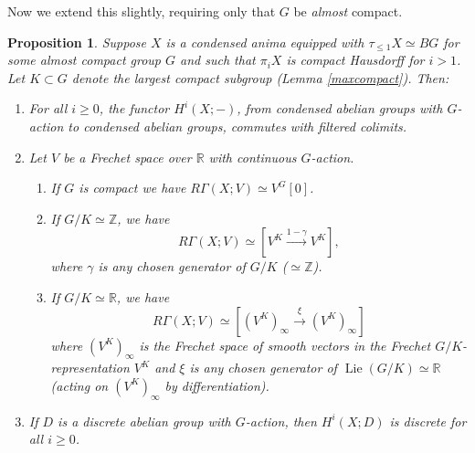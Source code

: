 \documentclass[12pt]{article}
\newtheorem{proposition}[theorem]{Proposition}
\theoremstyle{definition}
\newcommand{\on}{\operatorname}
\newcommand{\mbb}{\mathbb}
\begin{document}
Now we extend this slightly, requiring only that $G$ be \emph{almost} compact.

\begin{proposition}\label{cohachaus}
Suppose $X$ is a condensed anima equipped with $\tau_{\leq 1}X\simeq BG$ for some almost compact group $G$ and such that $\pi_iX$ is compact Hausdorff for $i>1$.  Let $K\subset G$ denote the largest compact subgroup (Lemma \ref{maxcompact}).  Then:
\begin{enumerate}
\item For all $i\geq 0$, the functor $H^i(X;-)$, from condensed abelian groups with $G$-action to condensed abelian groups, commutes with filtered colimits.
\item Let $V$ be a Frechet space over $\mbb{R}$ with continuous $G$-action.
\begin{enumerate}
\item If $G$ is compact we have $R\Gamma(X;V) \simeq V^G[0]$.
\item If $G/K\simeq \mbb{Z}$, we have
$$R\Gamma(X;V) \simeq [V^K \overset{1-\gamma}{\longrightarrow} V^K],$$
where $\gamma$ is any chosen generator of $G/K$ ($\simeq \mbb{Z}$).
\item If $G/K\simeq \mbb{R}$, we have
$$R\Gamma(X;V) \simeq [(V^K)_\infty \overset{\xi}{\longrightarrow}(V^K)_\infty]$$
where $(V^K)_\infty$ is the Frechet space of smooth vectors in the Frechet $G/K$-representation $V^K$ and $\xi$ is any chosen generator of $\on{Lie}(G/K)\simeq \mbb{R}$ (acting on $(V^K)_\infty$ by differentiation).
\end{enumerate}

\item If $D$ is a discrete abelian group with $G$-action, then $H^i(X;D)$ is discrete for all $i\geq 0$.
\end{enumerate}

\end{proposition}
\end{document}
